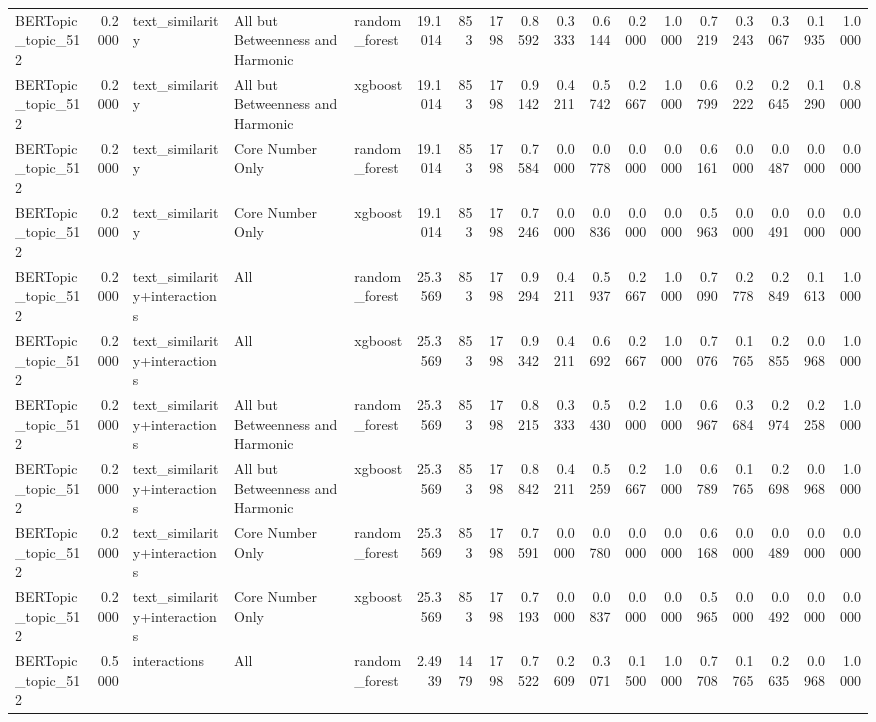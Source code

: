 \begin{tabular}{lrlllrrrrrrrrrrrrr}
BERTopic_topic_512 & 0.2000 & text_similarity & All but Betweenness and Harmonic & random_forest & 19.1014 & 853 & 1798 & 0.8592 & 0.3333 & 0.6144 & 0.2000 & 1.0000 & 0.7219 & 0.3243 & 0.3067 & 0.1935 & 1.0000 \\
BERTopic_topic_512 & 0.2000 & text_similarity & All but Betweenness and Harmonic & xgboost & 19.1014 & 853 & 1798 & 0.9142 & 0.4211 & 0.5742 & 0.2667 & 1.0000 & 0.6799 & 0.2222 & 0.2645 & 0.1290 & 0.8000 \\
BERTopic_topic_512 & 0.2000 & text_similarity & Core Number Only & random_forest & 19.1014 & 853 & 1798 & 0.7584 & 0.0000 & 0.0778 & 0.0000 & 0.0000 & 0.6161 & 0.0000 & 0.0487 & 0.0000 & 0.0000 \\
BERTopic_topic_512 & 0.2000 & text_similarity & Core Number Only & xgboost & 19.1014 & 853 & 1798 & 0.7246 & 0.0000 & 0.0836 & 0.0000 & 0.0000 & 0.5963 & 0.0000 & 0.0491 & 0.0000 & 0.0000 \\
BERTopic_topic_512 & 0.2000 & text_similarity+interactions & All & random_forest & 25.3569 & 853 & 1798 & 0.9294 & 0.4211 & 0.5937 & 0.2667 & 1.0000 & 0.7090 & 0.2778 & 0.2849 & 0.1613 & 1.0000 \\
BERTopic_topic_512 & 0.2000 & text_similarity+interactions & All & xgboost & 25.3569 & 853 & 1798 & 0.9342 & 0.4211 & 0.6692 & 0.2667 & 1.0000 & 0.7076 & 0.1765 & 0.2855 & 0.0968 & 1.0000 \\
BERTopic_topic_512 & 0.2000 & text_similarity+interactions & All but Betweenness and Harmonic & random_forest & 25.3569 & 853 & 1798 & 0.8215 & 0.3333 & 0.5430 & 0.2000 & 1.0000 & 0.6967 & 0.3684 & 0.2974 & 0.2258 & 1.0000 \\
BERTopic_topic_512 & 0.2000 & text_similarity+interactions & All but Betweenness and Harmonic & xgboost & 25.3569 & 853 & 1798 & 0.8842 & 0.4211 & 0.5259 & 0.2667 & 1.0000 & 0.6789 & 0.1765 & 0.2698 & 0.0968 & 1.0000 \\
BERTopic_topic_512 & 0.2000 & text_similarity+interactions & Core Number Only & random_forest & 25.3569 & 853 & 1798 & 0.7591 & 0.0000 & 0.0780 & 0.0000 & 0.0000 & 0.6168 & 0.0000 & 0.0489 & 0.0000 & 0.0000 \\
BERTopic_topic_512 & 0.2000 & text_similarity+interactions & Core Number Only & xgboost & 25.3569 & 853 & 1798 & 0.7193 & 0.0000 & 0.0837 & 0.0000 & 0.0000 & 0.5965 & 0.0000 & 0.0492 & 0.0000 & 0.0000 \\
BERTopic_topic_512 & 0.5000 & interactions & All & random_forest & 2.4939 & 1479 & 1798 & 0.7522 & 0.2609 & 0.3071 & 0.1500 & 1.0000 & 0.7708 & 0.1765 & 0.2635 & 0.0968 & 1.0000 \\

\end{tabular}
